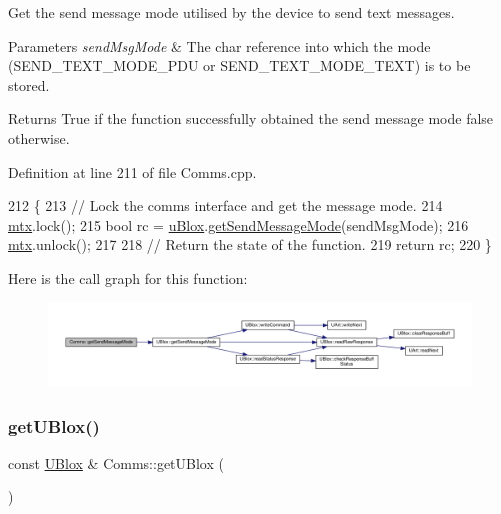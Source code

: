 Get the send message mode utilised by the device to send text messages.


\begin{DoxyParams}{Parameters}
{\em send\+Msg\+Mode} & The char reference into which the mode (S\+E\+N\+D\+\_\+\+T\+E\+X\+T\+\_\+\+M\+O\+D\+E\+\_\+\+P\+DU or S\+E\+N\+D\+\_\+\+T\+E\+X\+T\+\_\+\+M\+O\+D\+E\+\_\+\+T\+E\+XT) is to be stored. \\
\hline
\end{DoxyParams}
\begin{DoxyReturn}{Returns}
True if the function successfully obtained the send message mode false otherwise. 
\end{DoxyReturn}


Definition at line 211 of file Comms.\+cpp.


\begin{DoxyCode}
212 \{
213     \textcolor{comment}{// Lock the comms interface and get the message mode.}
214     \hyperlink{class_comms_a21df861b1202573e4cd0cb5666d638fe}{mtx}.lock();
215     \textcolor{keywordtype}{bool} rc = \hyperlink{class_comms_ac64dea134b116147e5441172346dbd6c}{uBlox}.\hyperlink{class_u_blox_aee30d82dcf52335d19f77e766db78ab4}{getSendMessageMode}(sendMsgMode);
216     \hyperlink{class_comms_a21df861b1202573e4cd0cb5666d638fe}{mtx}.unlock();
217 
218     \textcolor{comment}{// Return the state of the function.}
219     \textcolor{keywordflow}{return} rc;
220 \}
\end{DoxyCode}
Here is the call graph for this function\+:
\nopagebreak
\begin{figure}[H]
\begin{center}
\leavevmode
\includegraphics[width=350pt]{d8/dcc/class_comms_ade9963ad1f934a79a6b584dd7abfe515_cgraph}
\end{center}
\end{figure}
\mbox{\label{class_comms_afdd15b4aeca5d91f2f263910c444c957}} 
\subsubsection{\texorpdfstring{get\+U\+Blox()}{getUBlox()}}
{\footnotesize\ttfamily const \hyperlink{class_u_blox}{U\+Blox} \& Comms\+::get\+U\+Blox (\begin{DoxyParamCaption}{ }\end{DoxyParamCaption})}

